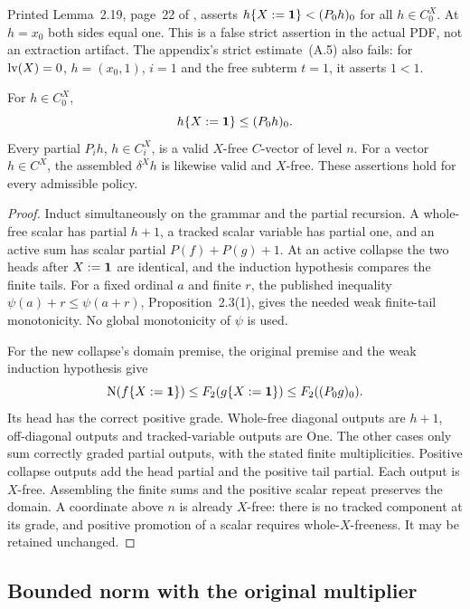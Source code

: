 \begin{remark}\label{wwsc:rem:error}
Printed Lemma~2.19, page~22 of \cite{ww}, asserts
$h\{X:=\mathbf1\}<(P_0h)_0$ for all $h\in C_0^X$.
At $h=x_0$ both sides equal one. This is a false strict assertion in
the actual PDF, not an extraction artifact. The appendix's strict
estimate~(A.5) also fails: for $\operatorname{lv}(X)=0$, $h=(x_0,1)$, $i=1$ and
the free subterm $t=1$, it asserts $1<1$.
\end{remark}

\begin{theorem}\label{wwsc:thm:weak}
For $h\in C_0^X$,
\[
 h\{X:=\mathbf1\}\le(P_0h)_0.
\]
Every partial $P_i h$, $h\in C_i^X$, is a valid $X$-free $C$-vector
of level $n$. For a vector $h\in C^X$, the assembled $\delta^X h$ is
likewise valid and $X$-free.
These assertions hold for every admissible policy.
\end{theorem}
\begin{proof}
Induct simultaneously on the grammar and the partial recursion. A
whole-free scalar has partial $h+1$, a tracked scalar variable has
partial one, and an active sum has scalar partial $P(f)+P(g)+1$.
At an active collapse the two heads after $X:=\mathbf1$ are identical,
and the induction hypothesis compares the finite tails. For a fixed
ordinal $a$ and finite $r$, the published inequality
$\psi(a)+r\le\psi(a+r)$, Proposition~2.3(1), gives the needed weak
finite-tail monotonicity. No global monotonicity of $\psi$ is used.

For the new collapse's domain premise, the original premise and the
weak induction hypothesis give
\[
 \operatorname{N}(f\{X:=\mathbf1\})
 \le F_2(g\{X:=\mathbf1\})\le F_2((P_0g)_0).
\]
Its head has the correct positive grade. Whole-free diagonal outputs
are $h+1$, off-diagonal outputs and tracked-variable outputs are One.
The other cases only sum correctly graded partial outputs, with the
stated finite multiplicities. Positive collapse outputs add the head
partial and the positive tail partial. Each output is $X$-free.
Assembling the finite sums and the positive scalar repeat preserves
the domain. A coordinate above $n$ is already $X$-free: there is no
tracked component at its grade, and positive promotion of a scalar
requires whole-$X$-freeness. It may be retained unchanged.
\end{proof}

\subsection{Bounded norm with the original multiplier}

